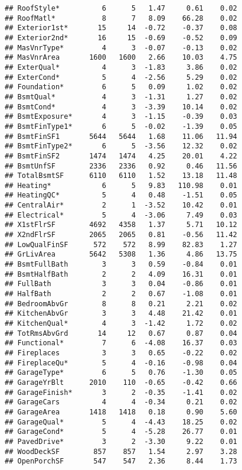 \documentclass[
]{article}
\begin{document}
\begin{verbatim}
## RoofStyle*          6      5   1.47     0.61    0.02
## RoofMatl*           8      7   8.09    66.28    0.02
## Exterior1st*       15     14  -0.72    -0.37    0.08
## Exterior2nd*       16     15  -0.69    -0.52    0.09
## MasVnrType*         4      3  -0.07    -0.13    0.02
## MasVnrArea       1600   1600   2.66    10.03    4.75
## ExterQual*          4      3  -1.83     3.86    0.02
## ExterCond*          5      4  -2.56     5.29    0.02
## Foundation*         6      5   0.09     1.02    0.02
## BsmtQual*           4      3  -1.31     1.27    0.02
## BsmtCond*           4      3  -3.39    10.14    0.02
## BsmtExposure*       4      3  -1.15    -0.39    0.03
## BsmtFinType1*       6      5  -0.02    -1.39    0.05
## BsmtFinSF1       5644   5644   1.68    11.06   11.94
## BsmtFinType2*       6      5  -3.56    12.32    0.02
## BsmtFinSF2       1474   1474   4.25    20.01    4.22
## BsmtUnfSF        2336   2336   0.92     0.46   11.56
## TotalBsmtSF      6110   6110   1.52    13.18   11.48
## Heating*            6      5   9.83   110.98    0.01
## HeatingQC*          5      4   0.48    -1.51    0.05
## CentralAir*         2      1  -3.52    10.42    0.01
## Electrical*         5      4  -3.06     7.49    0.03
## X1stFlrSF        4692   4358   1.37     5.71   10.12
## X2ndFlrSF        2065   2065   0.81    -0.56   11.42
## LowQualFinSF      572    572   8.99    82.83    1.27
## GrLivArea        5642   5308   1.36     4.86   13.75
## BsmtFullBath        3      3   0.59    -0.84    0.01
## BsmtHalfBath        2      2   4.09    16.31    0.01
## FullBath            3      3   0.04    -0.86    0.01
## HalfBath            2      2   0.67    -1.08    0.01
## BedroomAbvGr        8      8   0.21     2.21    0.02
## KitchenAbvGr        3      3   4.48    21.42    0.01
## KitchenQual*        4      3  -1.42     1.72    0.02
## TotRmsAbvGrd       14     12   0.67     0.87    0.04
## Functional*         7      6  -4.08    16.37    0.03
## Fireplaces          3      3   0.65    -0.22    0.02
## FireplaceQu*        5      4  -0.16    -0.98    0.04
## GarageType*         6      5   0.76    -1.30    0.05
## GarageYrBlt      2010    110  -0.65    -0.42    0.66
## GarageFinish*       3      2  -0.35    -1.41    0.02
## GarageCars          4      4  -0.34     0.21    0.02
## GarageArea       1418   1418   0.18     0.90    5.60
## GarageQual*         5      4  -4.43    18.25    0.02
## GarageCond*         5      4  -5.28    26.77    0.01
## PavedDrive*         3      2  -3.30     9.22    0.01
## WoodDeckSF        857    857   1.54     2.97    3.28
## OpenPorchSF       547    547   2.36     8.44    1.73

\end{verbatim}
\end{document}
